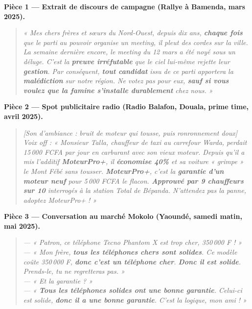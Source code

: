 \documentclass[11pt]{article}
\begin{document}
\vspace{0.5em}
\noindent\textbf{Pièce 1 — Extrait de discours de campagne (Rallye à Bamenda, mars 2025).}
\begin{quote}
\emph{« Mes chers frères et sœurs du Nord-Ouest, depuis dix ans, \textbf{chaque fois} que le parti au pouvoir organise un meeting, il pleut des cordes sur la ville. La semaine dernière encore, le meeting du 12 mars a été noyé sous un déluge. C'est la \textbf{preuve irréfutable} que le ciel lui-même rejette leur \textbf{gestion}. Par conséquent, \textbf{tout candidat} issu de ce parti apportera la \textbf{malédiction} sur notre région. Ne votez pas pour eux, \textbf{sauf si vous voulez que la famine s'installe durablement} chez nous. »}
\end{quote}

\vspace{0.5em}
\noindent\textbf{Pièce 2 — Spot publicitaire radio (Radio Balafon, Douala, prime time, avril 2025).}
\begin{quote}
\emph{[Son d'ambiance : bruit de moteur qui tousse, puis ronronnement doux] \\
Voix off : « Monsieur Talla, chauffeur de taxi au carrefour Warda, perdait 15\,000 FCFA par jour en carburant avec son vieux moteur. Depuis qu'il a mis l'additif \textbf{MoteurPro+}, il \textbf{économise 40\%} et sa voiture « grimpe » le Mont Fébé sans tousser. \textbf{MoteurPro+}, c'est la \textbf{garantie d'un moteur neuf} pour 5\,000 FCFA le flacon. \textbf{Approuvé par 9 chauffeurs sur 10} interrogés à la station Total de Bépanda. N'attendez pas la panne, adoptez MoteurPro+ ! »}
\end{quote}

\vspace{0.5em}
\noindent\textbf{Pièce 3 — Conversation au marché Mokolo (Yaoundé, samedi matin, mai 2025).}
\begin{quote}
\emph{— « Patron, ce téléphone \textit{Tecno Phantom X} est trop cher, 350\,000 F ! » \\
— « Mon frère, \textbf{tous les téléphones chers sont solides}. Ce modèle coûte 350\,000 F, \textbf{donc c'est un téléphone cher}. \textbf{Donc il est solide}. Prends-le, tu ne regretteras pas. » \\
— « Et la garantie ? » \\
— « \textbf{Tous les téléphones solides ont une bonne garantie}. Celui-ci est solide, \textbf{donc il a une bonne garantie}. C'est la logique, mon ami ! »}
\end{quote}
\end{document}
